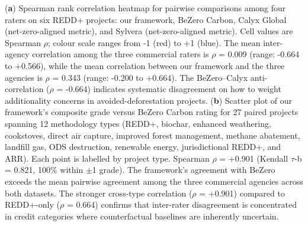 \documentclass[11pt]{article}
\begin{document}
(\textbf{a}) Spearman rank correlation heatmap for pairwise comparisons among four raters on six REDD+ projects: our framework, BeZero Carbon, Calyx Global (net-zero-aligned metric), and Sylvera (net-zero-aligned metric). Cell values are Spearman $\rho$; colour scale ranges from -1 (red) to +1 (blue). The mean inter-agency correlation among the three commercial raters is $\rho$ = 0.009 (range: -0.664 to +0.566), while the mean correlation between our framework and the three agencies is $\rho$ = 0.343 (range: -0.200 to +0.664). The BeZero--Calyx anti-correlation ($\rho$ = -0.664) indicates systematic disagreement on how to weight additionality concerns in avoided-deforestation projects. (\textbf{b}) Scatter plot of our framework's composite grade versus BeZero Carbon rating for 27 paired projects spanning 12 methodology types (REDD+, biochar, enhanced weathering, cookstoves, direct air capture, improved forest management, methane abatement, landfill gas, ODS destruction, renewable energy, jurisdictional REDD+, and ARR). Each point is labelled by project type. Spearman $\rho$ = +0.901 (Kendall $\tau$-b = 0.821, 100\% within $\pm$1 grade). The framework's agreement with BeZero exceeds the mean pairwise agreement among the three commercial agencies across both datasets. The stronger cross-type correlation ($\rho$ = +0.901) compared to REDD+-only ($\rho$ = 0.664) confirms that inter-rater disagreement is concentrated in credit categories where counterfactual baselines are inherently uncertain.
\end{document}
